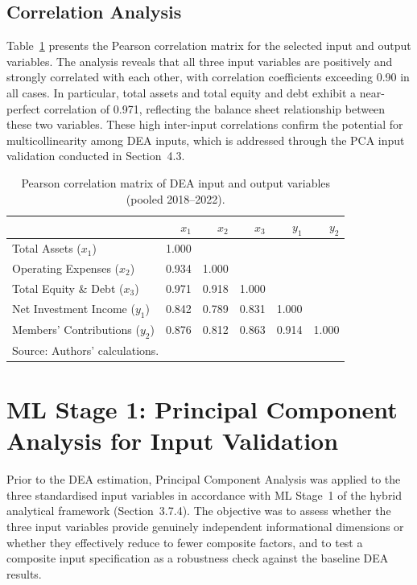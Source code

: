 \documentclass[12pt,a4paper]{article}
\begin{document}
\subsection{Correlation Analysis}

Table~\ref{tab:correlation} presents the Pearson correlation matrix for the selected input and output variables. The analysis reveals that all three input variables are positively and strongly correlated with each other, with correlation coefficients exceeding 0.90 in all cases. In particular, total assets and total equity and debt exhibit a near-perfect correlation of 0.971, reflecting the balance sheet relationship between these two variables. These high inter-input correlations confirm the potential for multicollinearity among DEA inputs, which is addressed through the PCA input validation conducted in Section~4.3.

\begin{table}[H]
\centering
\caption{Pearson correlation matrix of DEA input and output variables (pooled 2018--2022).}
\label{tab:correlation}
\begin{tabular}{lrrrrr}
\toprule
 & $x_1$ & $x_2$ & $x_3$ & $y_1$ & $y_2$ \\
\midrule
Total Assets ($x_1$)           & 1.000 &       &       &       &       \\
Operating Expenses ($x_2$)     & 0.934 & 1.000 &       &       &       \\
Total Equity \& Debt ($x_3$)   & 0.971 & 0.918 & 1.000 &       &       \\
Net Investment Income ($y_1$)  & 0.842 & 0.789 & 0.831 & 1.000 &       \\
Members' Contributions ($y_2$) & 0.876 & 0.812 & 0.863 & 0.914 & 1.000 \\
\bottomrule
\multicolumn{6}{l}{\footnotesize Source: Authors' calculations.}
\end{tabular}
\end{table}

\section{ML Stage 1: Principal Component Analysis for Input Validation}

Prior to the DEA estimation, Principal Component Analysis was applied to the three standardised input variables in accordance with ML Stage~1 of the hybrid analytical framework (Section~3.7.4). The objective was to assess whether the three input variables provide genuinely independent informational dimensions or whether they effectively reduce to fewer composite factors, and to test a composite input specification as a robustness check against the baseline DEA results.
\end{document}
